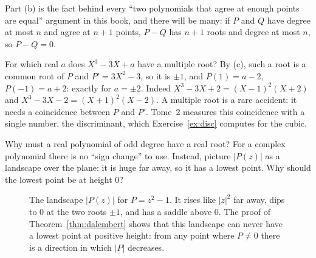 Part (b) is the fact behind every ``two polynomials that agree at enough points are equal'' argument in this book, and there will be many: if
$P$ and $Q$ have degree at most $n$ and agree at $n+1$ points, $P-Q$ has $n+1$ roots and degree at most $n$, so $P-Q=0$.

\begin{examplex}
For which real $a$ does $X^3-3X+a$ have a multiple root? By (c), such a root is a common root of $P$ and $P'=3X^2-3$, so it is $\pm1$, and
$P(1)=a-2$, $P(-1)=a+2$: exactly for $a=\pm2$. Indeed $X^3-3X+2=(X-1)^2(X+2)$ and $X^3-3X-2=(X+1)^2(X-2)$.
A multiple root is a rare accident: it needs a coincidence between $P$ and $P'$. Tome~2 measures this coincidence with a single number, the
discriminant, which Exercise~\ref{ex:disc} computes for the cubic.
\end{examplex}

\begin{think}
Why must a real polynomial of odd degree have a real root? For a complex polynomial there is no ``sign change'' to use. Instead, picture $|P(z)|$ as a landscape over the plane: it is huge far away, so it has a lowest point. Why should the lowest point be at height $0$?
\end{think}

\begin{figure}[ht]
\centering
{}
\caption{The landscape $|P(z)|$ for $P=z^2-1$. It rises like $|z|^2$ far away, dips to $0$ at the two roots $\pm1$, and has a saddle above $0$. The proof of Theorem~\ref{thm:dalembert} shows that this landscape can never have a lowest point at positive height: from any point where $P\ne0$ there is a direction in which $|P|$ decreases.}
\label{fig:landscape}
\end{figure}

